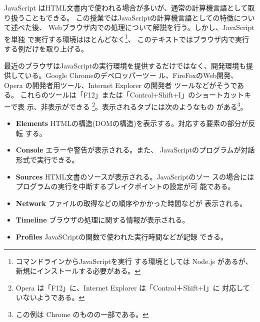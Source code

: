 JavaScript はHTML文書内で使われる場合が多いが、通常の計算機言語として取
り扱うこともできる。
この授業ではJavaScriptの計算機言語としての特徴について述べた後、
Webブラウザ内での処理について解説を行う。しかし、JavaScriptを単独
で実行する環境はほとんどなく\footnote{コマンドラインからJavaScriptを実行
する環境としては Node.js があるが、新規にインストールする必要がある。}、
このテキストではブラウザ内で実行する例だけを取り上げる。

最近のブラウザはJavaScriptの実行環境を提供するだけではなく、開発環境も提
供している。Google Chromeのデベロッパーツー
ル、FireFoxのWeb開発、Opera の開発者用ツール、Internet Explorer の開発者
ツールなどがそうである。
これらのツールは「F12」または「Control+Shift+I」のショートカットキーで表
示、非表示ができる
\footnote{Opera は「F12」に、Internet Explorer は「Control＋Shift+I」に
対応していないようである。}。表示されるタブには次のようなもの
がある\footnote{この例は Chrome のものの一部である。}。
\begin{itemize}
 \item {\bfseries Elements }
       HTMLの構造(DOMの構造)を表示する。対応する要素の部分が反転
       する。
 \item {\bfseries Console }エラーや警告が表示される。また、
       JavaScriptのプログラムが対話形式で実行できる。
 \item {\bfseries Sources }HTML文書のソースが表示される。JavaScriptのソー
       スの場合にはプログラムの実行を中断するブレイクポイントの設定が可
       能である。
 \item {\bfseries Network }ファイルの取得などの順序やかかった時間などが
       表示される。
 \item {\bfseries Timeline }ブラウザの処理に関する情報が表示される。
 \item {\bfseries Profiles }JavaSCriptの関数で使われた実行時間などが記録
       できる。
\end{itemize}
